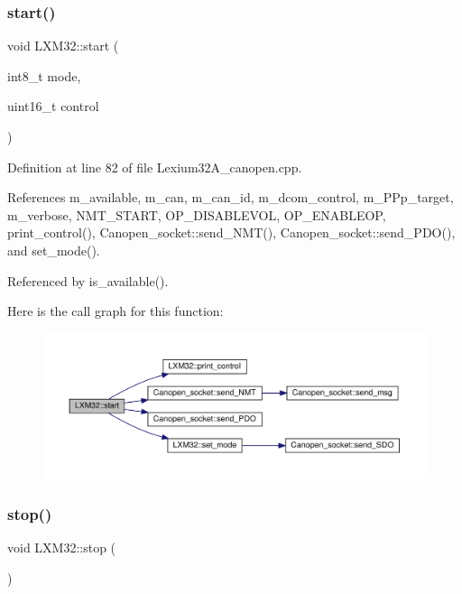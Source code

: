 \subsubsection{\texorpdfstring{start()}{start()}}
{\footnotesize\ttfamily void L\+X\+M32\+::start (\begin{DoxyParamCaption}\item[{int8\+\_\+t}]{mode,  }\item[{uint16\+\_\+t}]{control }\end{DoxyParamCaption})}



Definition at line 82 of file Lexium32\+A\+\_\+canopen.\+cpp.



References m\+\_\+available, m\+\_\+can, m\+\_\+can\+\_\+id, m\+\_\+dcom\+\_\+control, m\+\_\+\+P\+Pp\+\_\+target, m\+\_\+verbose, N\+M\+T\+\_\+\+S\+T\+A\+RT, O\+P\+\_\+\+D\+I\+S\+A\+B\+L\+E\+V\+OL, O\+P\+\_\+\+E\+N\+A\+B\+L\+E\+OP, print\+\_\+control(), Canopen\+\_\+socket\+::send\+\_\+\+N\+M\+T(), Canopen\+\_\+socket\+::send\+\_\+\+P\+D\+O(), and set\+\_\+mode().



Referenced by is\+\_\+available().

Here is the call graph for this function\+:\nopagebreak
\begin{figure}[H]
\begin{center}
\leavevmode
\includegraphics[width=350pt]{class_l_x_m32_ae15a405ad09357b6dd0296db5bbce92d_cgraph}
\end{center}
\end{figure}
\mbox{\label{class_l_x_m32_a73364111a5c2be2d60b7456704f7b9a8}} 
\subsubsection{\texorpdfstring{stop()}{stop()}}
{\footnotesize\ttfamily void L\+X\+M32\+::stop (\begin{DoxyParamCaption}{ }\end{DoxyParamCaption})}



